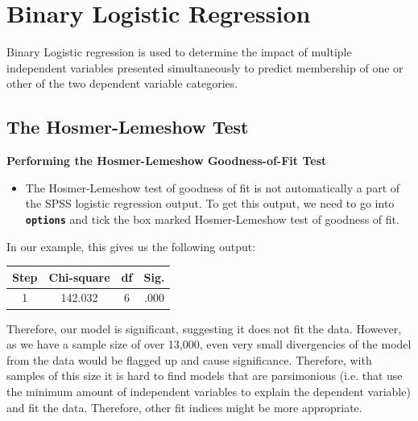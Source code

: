 \documentclass[a4paper,12pt]{article}
\begin{document}
\section{Binary Logistic Regression}
Binary Logistic regression is used to determine the impact of multiple independent variables
presented simultaneously to predict membership of one or other of the two
dependent variable categories.




\subsection{The Hosmer-Lemeshow Test}

\noindent \textbf{Performing the Hosmer-Lemeshow Goodness-of-Fit Test} 	
\begin{itemize}	
	\item 	
	The Hosmer-Lemeshow test of goodness of fit is not automatically a part of the SPSS logistic regression output. 
	To get this output, we need to go into \textbf{\texttt{options}} and tick the box marked Hosmer-Lemeshow test of goodness of fit. 
\end{itemize}



In our example, this gives us the following output:

\begin{center}
	\begin{tabular}{|c|c|c|c|}
		\hline  Step	& Chi-square&	df 	 & Sig. \\ \hline
		1	 & 142.032	& 6	 &.000 \\ 
		\hline 
	\end{tabular} 
\end{center}


Therefore, our model is significant, suggesting it does not fit the data. However, as we have a sample size of over 13,000, even very small divergencies of the model from the data would be flagged up and cause significance. Therefore, with samples of this size it is hard to find models that are parsimonious (i.e. that use the minimum amount of independent variables to explain the dependent variable) and fit the data. Therefore, other fit indices might be more appropriate.

\end{document}
